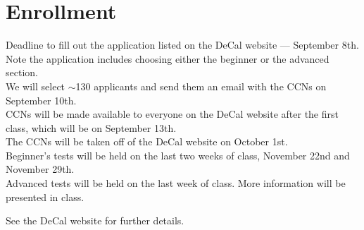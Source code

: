 \documentclass[11pt]{article}
\begin{document}
\section*{Enrollment}
Deadline to fill out the application listed on the DeCal website — September 8th.\\
Note the application includes choosing either the beginner or the advanced section.\\
We will select $\sim$130 applicants and send them an email with the CCNs on September 10th.\\
CCNs will be made available to everyone on the DeCal website after the first class, which will be on September 13th.\\
The CCNs will be taken off of the DeCal website on October 1st.\\
Beginner’s tests will be held on the last two weeks of class, November 22nd and November 29th.\\
Advanced tests will be held on the last week of class. More information will be presented in class.

See the DeCal website for further details.
\end{document}
